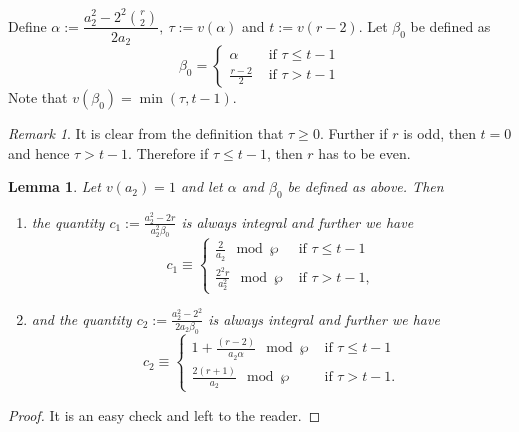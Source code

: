 \documentclass[11pt, reqno]{amsart}
\numberwithin{equation}{section}
\newtheorem{lemma}[thm]{Lemma}
\theoremstyle{definition}
\theoremstyle{remark}
\newtheorem{remark}[thm]{Remark}
\theoremstyle{definition}
\theoremstyle{remark}
\theoremstyle{remark}
\begin{document}
Define $\alpha := \dfrac{a_{2}^2-2^2{r\choose2}}{2a_{2}}, \:\tau:= v(\alpha)$ and $t:=v(r-2).$ Let $\beta_{0}$ be defined as 
$$\beta_{0} = \begin{cases}
    \alpha & \text{ if } \tau \leq t-1\\
    \frac{r-2}{2} & \text{ if } \tau>t-1
\end{cases}$$
Note that $v(\beta_{0})= \min(\tau,t-1)$. 
\begin{remark}\label{remparityslope1}
   It is clear from the definition that $\tau\geq 0$. Further if $r$ is odd, then $t=0$ and hence $\tau> t-1$. Therefore if $\tau \leq t-1$, then $r$ has to be even. 
\end{remark}

\begin{lemma}\label{sl1par}  
Let $v(a_2)=1$ and let $\alpha$ and $\beta_0$ be defined as above. Then 
\begin{enumerate}
      \item the quantity $c_{1}:=\frac{a_{2}^2-2r}{a_{2}^2\beta_{0}}$ is always integral and further we have $$c_{1}
      \equiv\begin{cases}
      \frac{2}{a_2}\mod\wp &\text{ if } \tau\leq t-1\\
      \frac{2^2r}{a_2^2}\mod\wp
      &\text{ if } \tau > t-1,
           \end{cases}
    $$ \label{sl1par1}
   \item and the quantity $c_{2}:=\frac{a_{2}^2-2^2}{2a_{2}\beta_{0}}$ is always integral and  further we have $$ c_{2}
   \equiv\begin{cases}
   1+\frac{(r-2)}{a_2\alpha}\mod\wp &\text{ if }\tau\leq t-1\\
   \frac{2(r+1)}{a_2}\mod\wp &\text{ if }\tau> t-1.
   \end{cases}
   $$\label{sl1par2} 
   \end{enumerate} 
\end{lemma}
\begin{proof}
It is an easy check and left to the reader.
\end{proof} 
\end{document}
